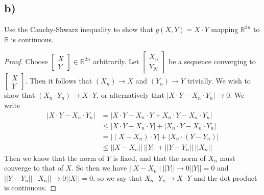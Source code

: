 \documentclass{article}
\theoremstyle{definition}
\begin{document}
\subsection*{b)}
\begin{mdframed}
    Use the Cauchy-Shwarz inequality to show that $g(X, Y) = X \cdot Y$ mapping $\mathbb{R}^{2n}$ to $\mathbb{R}$ is continuous.
\end{mdframed}
\begin{proof}
    Choose $\begin{bmatrix}
        X \\ Y
    \end{bmatrix} \in \mathbb{R}^{2n}$ arbitrarily. Let $\begin{bmatrix}
        X_n \\ Y_N
    \end{bmatrix}$ be a sequence converging to $\begin{bmatrix}
        X\\Y
    \end{bmatrix}$. Then it follows that $(X_n)\rightarrow X$ and $(Y_n) \rightarrow Y$ trivially.
    We wish to show that $(X_n \cdot Y_n) \rightarrow X \cdot Y$, or alternatively that $|X \cdot Y - X_n \cdot Y_n| \rightarrow 0$.
    We write 
    \begin{align*}
        |X \cdot Y - X_n \cdot Y_n| &= |X\cdot Y - X_n \cdot Y + X_n \cdot Y - X_n \cdot Y_n| \\
        &\leqslant |X\cdot Y - X_n \cdot Y| + |X_n \cdot Y - X_n \cdot Y_n| \\
        &= |(X - X_n) \cdot Y| + |X_n \cdot (Y - Y_n)|\\
        &\leqslant ||X - X_n|| \ ||Y|| + ||Y-Y_n|| \ ||X_n||
    \end{align*}
    Then we know that the norm of $Y$ is fixed, and that the norm of $X_n$ must converge to that of $X$.
    So then we have $||X - X_n|| \ ||Y|| \rightarrow 0||Y|| = 0$ and $||Y-Y_n|| \ ||X_n|| \rightarrow 0 ||X|| = 0$,
    so we say that $X_n \cdot Y_n \rightarrow X \cdot Y$ and the dot product is continuous.
\end{proof}
\end{document}
